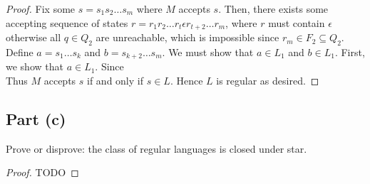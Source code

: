 \documentclass{article}
\begin{document}
\begin{proof}
    \noindent
    Fix some $s = s_1 s_2 \ldots s_m$ where $M$ accepts $s$. Then, there exists some accepting sequence of states 
    $r = r_1 r_2 \ldots r_t \epsilon r_{t+2} \ldots r_m$, where $r$ must contain $\epsilon$ otherwise all $q \in Q_2$ are unreachable, which is impossible since
    $r_m \in F_2 \subseteq Q_2$. Define $a = s_1 \ldots s_{k}$ and $b = s_{k+2} \ldots s_m$. We must show that $a \in L_1$ and $b \in L_1$. First, we show that 
    $a \in L_1$. Since  \\
    
    \noindent
    Thus $M$ accepts $s$ if and only if $s \in L$. Hence $L$ is regular as desired.
\end{proof}

\subsection*{Part (c)}

Prove or disprove: the class of regular languages is closed under star.

\begin{proof}
    TODO
\end{proof}
\end{document}
